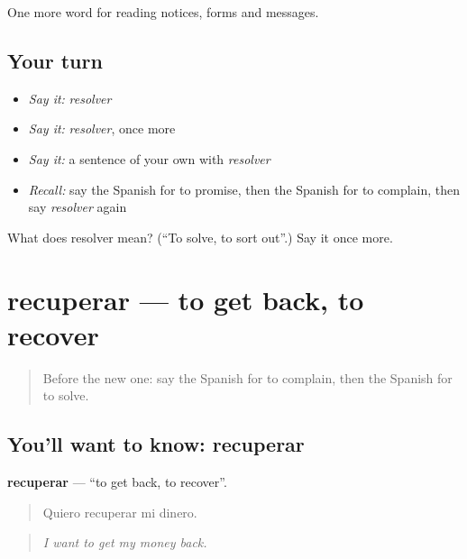 \begin{grammarlens}[title={What you've built}]
One more word for reading notices, forms and messages.
\end{grammarlens}

\subsection*{Your turn}
\begin{itemize}
\raggedright
  \item \emph{Say it:} \emph{resolver}
  \item \emph{Say it:} \emph{resolver}, once more
  \item \emph{Say it:} a sentence of your own with \emph{resolver}
  \item \emph{Recall:} say the Spanish for to promise, then the Spanish for to complain, then say \emph{resolver} again
\end{itemize}

\begin{tcolorbox}[breakable,colback=teal!4,colframe=teal!35!black,title={Before you move on}]
What does resolver mean? (\textquotedblleft{}To solve, to sort out\textquotedblright{}.) Say it once more.
\end{tcolorbox}
\section[recuperar]{recuperar — to get back, to recover}

\label{lesson:ES-C481-recuperar}



\begin{quote}
Before the new one: say the Spanish for to complain, then the Spanish for to solve.
\end{quote}

\subsection*{You'll want to know: recuperar}
\textbf{recuperar} — \textquotedblleft{}to get back, to recover\textquotedblright{}.

\begin{quote}
Quiero recuperar mi dinero.
\end{quote}

\begin{quote}
\emph{I want to get my money back.}
\end{quote}

